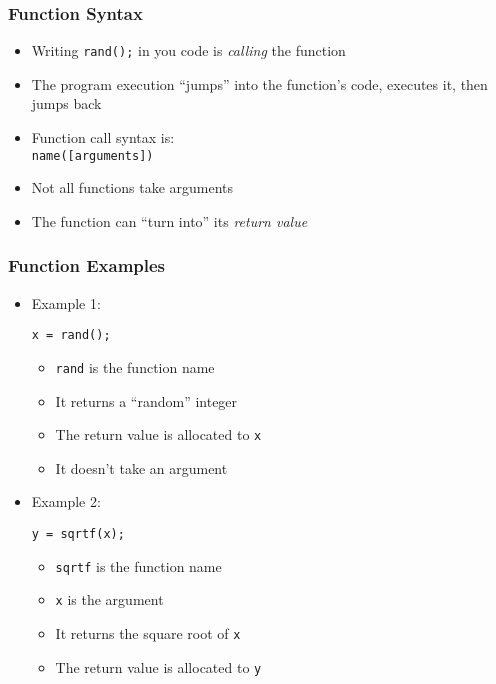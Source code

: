 \documentclass[14pt]{beamer}
\begin{document}
\begin{frame}[fragile]
\frametitle{Function Syntax}
\begin{itemize}
\item Writing \texttt{rand();} in you code is \textit{calling} the function
\item The program execution ``jumps'' into the function's code, executes it, then jumps back
\item Function call syntax is:\\
{\small \texttt{name([arguments])} }
\item Not all functions take arguments
\item The function can ``turn into'' its \textit{return value}
\end{itemize}
\end{frame}

\begin{frame}[fragile]
\frametitle{Function Examples}
\begin{itemize}
\item Example 1:
\begin{lstlisting}[style=CStyle]
x = rand();
\end{lstlisting}
	\begin{itemize}
		\item \texttt{rand} is the function name
		\item It returns a ``random'' integer
		\item The return value is allocated to \texttt{x}
		\item It doesn't take an argument 	
	\end{itemize}
\pause
\item Example 2:
\begin{lstlisting}[style=CStyle]
y = sqrtf(x);
\end{lstlisting}
	\begin{itemize}
		\item \texttt{sqrtf} is the function name
		\item \texttt{x} is the argument
		\item It returns the square root of \texttt{x}
		\item The return value is allocated to \texttt{y}
	\end{itemize}
\end{itemize}
\end{frame}
\end{document}
